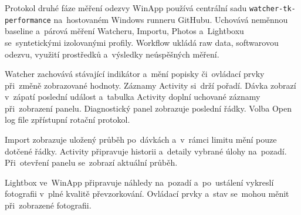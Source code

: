 \documentclass[11pt,a4paper]{article}
\newcommand{\codeword}[1]{\nolinkurl{#1}}
\begin{document}
Protokol druhé fáze měření odezvy WinApp používá centrální sadu
\codeword{watcher-tk-performance} na~hostovaném Windows runneru GitHubu.
Uchovává neměnnou baseline a~párová měření Watcheru, Importu, Photos
a~Lightboxu se~syntetickými izolovanými profily. Workflow ukládá raw data,
softwarovou odezvu, využití prostředků a~výsledky neúspěšných měření.

Watcher zachovává stávající indikátor a~mění popisky či~ovládací
prvky při~změně zobrazované hodnoty. Záznamy Activity si~drží pořadí.
Dávka zobrazí v~zápatí poslední událost a~tabulka Activity doplní
uchované záznamy při~zobrazení panelu.
Diagnostický panel zobrazuje poslední řádky. Volba Open log file zpřístupní
rotační protokol.

Import zobrazuje uložený průběh po~dávkách a~v~rámci limitu mění pouze
dotčené řádky. Activity připravuje historii a~detaily vybrané úlohy na~pozadí.
Při~otevření panelu se~zobrazí aktuální průběh.

Lightbox ve~WinApp připravuje náhledy na~pozadí a~po~ustálení vykreslí
fotografii v~plné kvalitě převzorkování. Ovládací prvky a~stav se~mohou
měnit při~zobrazené fotografii.
\end{document}
